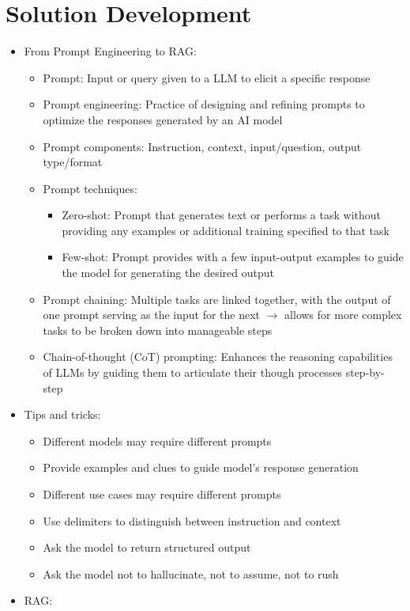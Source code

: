 \documentclass[11pt]{scrartcl}
\begin{document}
\newpage
\section{Solution Development}
\begin{itemize}
	\item From Prompt Engineering to RAG:
	\begin{itemize}
		\item Prompt: Input or query given to a LLM to elicit a specific response
		\item Prompt engineering: Practice of designing and refining prompts to optimize the responses generated by an AI model
		\item Prompt components: Instruction, context, input/question, output type/format
		\item Prompt techniques:
		\begin{itemize}
			\item Zero-shot: Prompt that generates text or performs a task without providing any examples or additional training specified to that task
			\item Few-shot: Prompt provides with a few input-output examples to guide the model for generating the desired output
		\end{itemize}
		\item Prompt chaining: Multiple tasks are linked together, with the output of one prompt serving as the input for the next $\to$ allows for more complex tasks to be broken down into manageable steps
		\item Chain-of-thought (CoT) prompting: Enhances the reasoning capabilities of LLMs by guiding them to articulate their though processes step-by-step
	\end{itemize}
	\item Tips and tricks:
	\begin{itemize}
		\item Different models may require different prompts
		\item Provide examples and clues to guide model's response generation
		\item Different use cases may require different prompts
		\item Use delimiters to distinguish between instruction and context
		\item Ask the model to return structured output
		\item Ask the model not to hallucinate, not to assume, not to rush
	\end{itemize}
	\item RAG:

\end{itemize}
\end{document}
